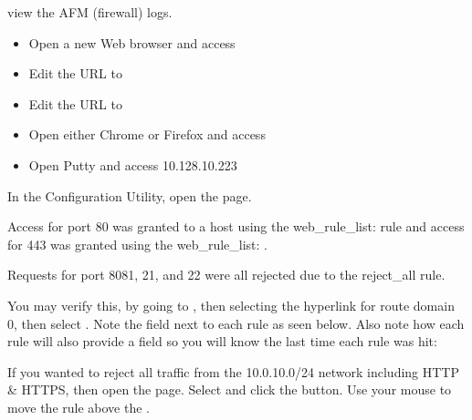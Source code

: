 \documentclass[letterpaper,10pt,english]{sphinxmanual}
\begin{document}
view the AFM (firewall) logs.
\begin{itemize}
\item {} 
Open a new Web browser and access

\item {} 
Edit the URL to 

\item {} 
Edit the URL to

\item {} 
Open either Chrome or Firefox and access

\item {} 
Open Putty and access 10.128.10.223

\end{itemize}

In the Configuration Utility, open the  page.

Access for port 80 was granted to a host using the web\_rule\_list:
 rule and access for 443 was granted using the
web\_rule\_list: .


Requests for port 8081, 21, and 22 were all rejected due to the
reject\_all rule.


You may verify this, by going to , then
selecting the hyperlink for route domain 0, then select .
Note the  field next to each rule as seen below. Also note
how each rule will also provide a  field so you will
know the last time each rule was hit:


If you wanted to reject all traffic from the 10.0.10.0/24 network
including HTTP \& HTTPS, then open the  page. Select  and click the
 button. Use your mouse to move the
 rule above the .
\end{document}

